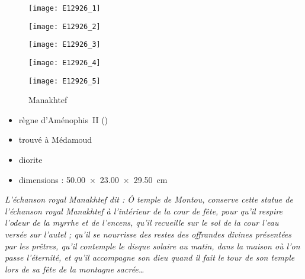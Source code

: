 \documentclass[dvipsnames,a4paper,twoside,10pt,openany,article]{memoir}
\begin{document}
\begin{figure}[!h]
  \noi\begin{minipage}[m]{0.33\textwidth}
    \centerfloat
    \texttt{[image: E12926\_1]}
  \end{minipage}%
  \quad%
  \begin{minipage}[m]{0.33\textwidth}
    \centerfloat
    \texttt{[image: E12926\_2]}
  \end{minipage}%
  \quad%
  \begin{minipage}[m]{0.33\textwidth}
    \centerfloat
    \texttt{[image: E12926\_3]}
  \end{minipage}%

  \noi\begin{minipage}[m]{0.50\textwidth}
    \centerfloat
    \texttt{[image: E12926\_4]}
  \end{minipage}%
  \hspace{\fill}%
  \begin{minipage}[m]{0.50\textwidth}
    \centerfloat
    \texttt{[image: E12926\_5]}
  \end{minipage}%
  \caption{Manakhtef }
  \label{fig:E12926}
\end{figure}

\begin{itemize}
  \item règne d'Aménophis~II ()
  \item trouvé à Médamoud
  \item diorite
  \item dimensions : \SI{50.00x23.00x29.50}{\cm}
\end{itemize}

\emph{L'échanson royal Manakhtef dit : \og Ô temple de Montou, 
conserve cette statue de l'échanson royal Manakhtef à l'intérieur 
de la cour de fête, pour qu'il respire l'odeur de la myrrhe et de 
l'encens, qu'il recueille sur le sol de la cour l'eau versée sur 
l'autel ; qu'il se nourrisse des restes des offrandes divines 
présentées par les prêtres, qu'il contemple le disque solaire au 
matin, dans la maison où l'on passe l'éternité, et qu'il accompagne 
son dieu quand il fait le tour de son temple lors de sa fête de la 
montagne sacrée\dots \fg}
\end{document}
